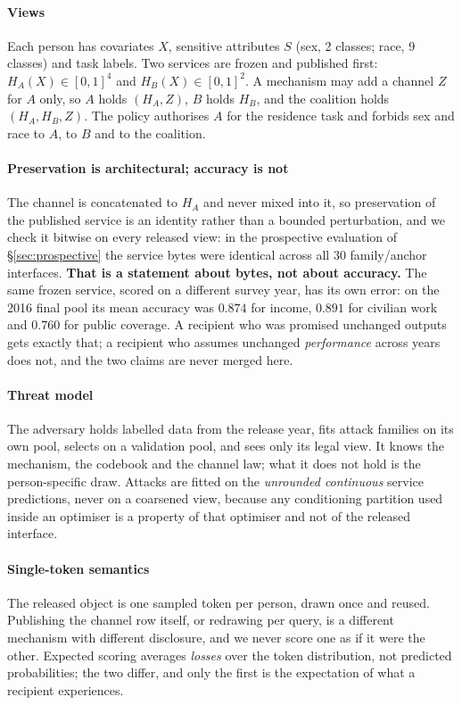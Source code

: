 \documentclass[conference]{IEEEtran}
\begin{document}
\paragraph{Views} Each person has covariates $X$, sensitive attributes $S$ (sex, 2 classes; race, 9
classes) and task labels. Two services are frozen and published first: $H_A(X)\in[0,1]^4$ and
$H_B(X)\in[0,1]^2$. A mechanism may add a channel $Z$ for $A$ only, so $A$ holds $(H_A,Z)$, $B$ holds
$H_B$, and the coalition holds $(H_A,H_B,Z)$. The policy authorises $A$ for the residence task and
forbids sex and race to $A$, to $B$ and to the coalition.

\paragraph{Preservation is architectural; accuracy is not} The channel is concatenated to $H_A$ and never
mixed into it, so preservation of the published service is an identity rather than a bounded perturbation,
and we check it bitwise on every released view: in the prospective evaluation of \S\ref{sec:prospective}
the service bytes were identical across all $30$ family/anchor interfaces. \textbf{That is a statement
about bytes, not about accuracy.} The same frozen service, scored on a different survey year, has its own
error: on the 2016 final pool its mean accuracy was $0.874$ for income, $0.891$ for civilian work and
$0.760$ for public coverage. A recipient who was promised unchanged outputs gets exactly that; a recipient
who assumes unchanged \emph{performance} across years does not, and the two claims are never merged here.

\paragraph{Threat model} The adversary holds labelled data from the release year, fits attack families on
its own pool, selects on a validation pool, and sees only its legal view. It knows the mechanism, the
codebook and the channel law; what it does not hold is the person-specific draw. Attacks are fitted on the
\emph{unrounded continuous} service predictions, never on a coarsened view, because any conditioning
partition used inside an optimiser is a property of that optimiser and not of the released interface.

\paragraph{Single-token semantics} The released object is one sampled token per person, drawn once and
reused. Publishing the channel row itself, or redrawing per query, is a different mechanism with different
disclosure, and we never score one as if it were the other. Expected scoring averages \emph{losses} over
the token distribution, not predicted probabilities; the two differ, and only the first is the expectation
of what a recipient experiences.
\end{document}
